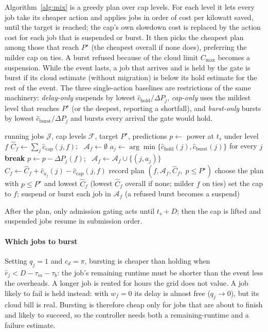 Algorithm~\ref{alg:mix} is a greedy plan over cap levels. For each level it lets every job take its cheaper action and applies jobs in order of cost per kilowatt saved, until the target is reached; the cap's own slowdown cost is replaced by the action cost for each job that is suspended or burst. It then picks the cheapest plan among those that reach $P^\star$ (the cheapest overall if none does), preferring the milder cap on ties.
A burst refused because of the cloud limit $C_{\max}$ becomes a suspension. While the event lasts, a job that arrives and is held by the gate is burst if its cloud estimate (without migration) is below its hold estimate for the rest of the event.
The three single-action baselines are restrictions of the same machinery: \emph{delay-only} suspends by lowest $\hat c_{\text{hold}}/\Delta P_j$, \emph{cap-only} uses the mildest level that reaches $P^\star$ (or the deepest, reporting a shortfall), and \emph{burst-only} bursts by lowest $\hat c_{\text{burst}}/\Delta P_j$ and bursts every arrival the gate would hold.

\begin{algorithm}[t]
\caption{Mix controller at event start $t_s$}
\label{alg:mix}
\begin{algorithmic}[1]
\Require running jobs $\mathcal J$, cap levels $\mathcal F$, target $P^\star$, predictions
  \State $p\leftarrow$ power at $t_s$ under level $f$
  \State $\hat C_f\leftarrow\sum_{j}\hat c_{\text{cap}}(j,f)$;~ $\mathcal A_f\leftarrow\emptyset$
  \State $a_j\leftarrow\arg\min\{\hat c_{\text{hold}}(j),\hat c_{\text{burst}}(j)\}$ for every $j$
     \textbf{break} \EndIf
    \State $p\leftarrow p-\Delta P_j(f)$;~ $\mathcal A_f\leftarrow\mathcal A_f\cup\{(j,a_j)\}$
    \State $\hat C_f\leftarrow\hat C_f+\hat c_{a_j}(j)-\hat c_{\text{cap}}(j,f)$
  \EndFor
  \State record plan $(f,\mathcal A_f,\hat C_f,\;p\le P^\star)$
\EndFor
\State choose the plan with $p\le P^\star$ and lowest $\hat C_f$ (lowest $\hat C_f$ overall if none; milder $f$ on ties)
\State set the cap to $f$; suspend or burst each job in $\mathcal A_f$ (a refused burst becomes a suspend)
\end{algorithmic}
\end{algorithm}

After the plan, only admission gating acts until $t_s+D$; then the cap is lifted and suspended jobs resume in submission order.

\paragraph{Which jobs to burst}
Setting $q_j=1$ and $c_d=\pi$, bursting is cheaper than holding when $\hat r_j<D-\tau_m-\tau_b$: the job's remaining runtime must be shorter than the event less the overheads. A longer job is rented for hours the grid does not value. A job likely to fail is held instead: with $w_f=0$ its delay is almost free ($q_j\to 0$), but its cloud bill is real. Bursting is therefore cheap only for jobs that are about to finish and likely to succeed, so the controller needs both a remaining-runtime and a failure estimate.

